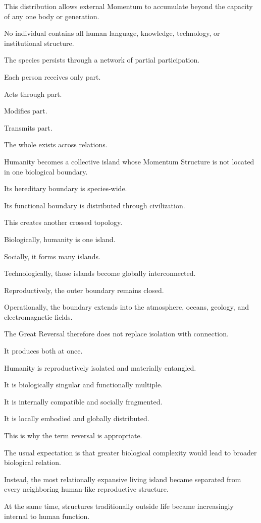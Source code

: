 This distribution allows external Momentum to accumulate beyond the capacity of any one body or generation.

No individual contains all human language, knowledge, technology, or institutional structure.

The species persists through a network of partial participation.

Each person receives only part.

Acts through part.

Modifies part.

Transmits part.

The whole exists across relations.

Humanity becomes a collective island whose Momentum Structure is not located in one biological boundary.

Its hereditary boundary is species-wide.

Its functional boundary is distributed through civilization.

This creates another crossed topology.

Biologically, humanity is one island.

Socially, it forms many islands.

Technologically, those islands become globally interconnected.

Reproductively, the outer boundary remains closed.

Operationally, the boundary extends into the atmosphere, oceans, geology, and electromagnetic fields.

The Great Reversal therefore does not replace isolation with connection.

It produces both at once.

Humanity is reproductively isolated and materially entangled.

It is biologically singular and functionally multiple.

It is internally compatible and socially fragmented.

It is locally embodied and globally distributed.

This is why the term reversal is appropriate.

The usual expectation is that greater biological complexity would lead to broader biological relation.

Instead, the most relationally expansive living island became separated from every neighboring human-like reproductive structure.

At the same time, structures traditionally outside life became increasingly internal to human function.

